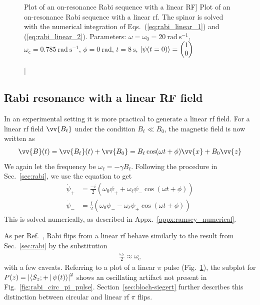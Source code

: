 \begin{figure}
\begin{subfigure}{.45\textwidth}
\end{subfigure}
\caption
[Plot of an on-resonance Rabi sequence with a linear RF]
{Plot of an on-resonance Rabi sequence with a linear \acrshort{rf}. The spinor is solved with the numerical integration of Eqs.~(\ref{eq:rabi_linear_1}) and (\ref{eq:rabi_linear_2}). Parameters: $\omega=\omega_0=\qty{20}{\radian\ \s^{-1}}$, $\omega_\text{c}=\qty{0.785}{\radian\ \s^{-1}}$, $\phi=\qty{0}{\radian}$, $t=\qty{8}{\s}$, $\Ket{\psi(t=0)}=\left( \begin{matrix}
    1 \\
    0
\end{matrix}\right)$}
\label{fig:rabi_linear_pi_pulse}
\end{figure}



\subsection{Rabi resonance with a linear RF field}


In an experimental setting it is more practical to generate a linear \acrshort*{rf} field. For a linear \acrshort*{rf} field $\vv{B_\ell}$ under the condition $B_\ell \ll B_0$, the magnetic field is now written as
%
\begin{gather}
    \vv{B}(t)=\vv{B_\ell}(t) + \vv{B_0}=B_\ell \cos (\omega t + \phi) \vv{x} + B_0 \vv{z}
\end{gather}
%
We again let the frequency be $\omega_\ell=-\gamma B_\ell$. Following the procedure in Sec.~\ref{sec:rabi}, we use the \schrodinger equation to get
%
\begin{align}
    \dot{\psi}_+ &=\frac{-i}{2}\left( \omega_0 \psi_+ + \omega_\ell \psi_-  \cos(\omega t + \phi) \right)\label{eq:rabi_linear_1}\\
    \dot{\psi}_- &=\frac{i}{2}\left( \omega_0 \psi_- - \omega_\ell \psi_+ \cos(\omega t + \phi)  \right)\label{eq:rabi_linear_2}
\end{align}
%
This is solved numerically, as described in Appx.~\ref{appx:ramsey_numerical}.

As per Ref.~\cite{rabi_1938}, Rabi flips from a linear \acrshort*{rf} behave similarly to the result from  Sec.~\ref{sec:rabi} by the substitution 
%
\begin{gather}
    \frac{\omega_\ell}{2}\approx\omega_\text{c}
\end{gather}
%
with a few caveats. Referring to a plot of a linear $\pi$ pulse (Fig.~\ref{fig:rabi_linear_pi_pulse}), the subplot for $P(z)=\left| \Braket{S_z;+ | \psi(t)} \right|^2 $ shows an oscillating artifact not present in Fig.~\ref{fig:rabi_circ_pi_pulse}. Section~\ref{sec:bloch-siegert} further describes this distinction between circular and linear \acrshort*{rf} $\pi$ flips.

